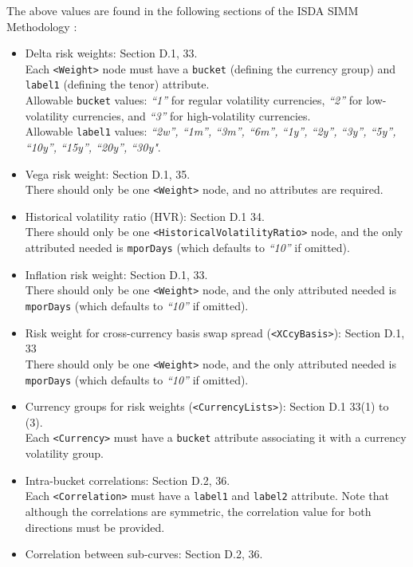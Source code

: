 The above values are found in the following sections of the ISDA SIMM Methodology \cite{SIMM2.5A}:
\begin{itemize}
  \item Delta risk weights: Section D.1, 33. \\
    Each {\tt <Weight>} node must have a {\tt bucket} (defining the currency group) and {\tt label1} (defining the tenor) attribute.\\
    Allowable {\tt bucket} values: \emph{``1''} for regular volatility currencies, \emph{``2''} for low-volatility currencies, and \emph{``3''} for high-volatility currencies. \\
    Allowable {\tt label1} values: \emph{``2w'', ``1m'', ``3m'', ``6m'', ``1y'', ``2y'', ``3y'', ``5y'', ``10y'', ``15y'', ``20y'', ``30y"}.
  \item Vega risk weight: Section D.1, 35. \\
    There should only be one {\tt <Weight>} node, and no attributes are required.
  \item Historical volatility ratio (HVR): Section D.1 34. \\
    There should only be one {\tt <HistoricalVolatilityRatio>} node, and the only attributed needed is {\tt mporDays} (which defaults to \emph{``10''} if omitted).
  \item Inflation risk weight: Section D.1, 33. \\
    There should only be one {\tt <Weight>} node, and the only attributed needed is {\tt mporDays} (which defaults to \emph{``10''} if omitted).
  \item Risk weight for cross-currency basis swap spread ({\tt <XCcyBasis>}): Section D.1, 33 \\
    There should only be one {\tt <Weight>} node, and the only attributed needed is {\tt mporDays} (which defaults to \emph{``10''} if omitted).
  \item Currency groups for risk weights ({\tt <CurrencyLists>}): Section D.1 33(1) to (3). \\
    Each {\tt <Currency>} must have a {\tt bucket} attribute associating it with a currency volatility group.
  \item Intra-bucket correlations: Section D.2, 36. \\
    Each {\tt <Correlation>} must have a {\tt label1} and {\tt label2} attribute. Note that although the correlations
    are symmetric, the correlation value for both directions must be provided.
  \item Correlation between sub-curves: Section D.2, 36.

\end{itemize}
